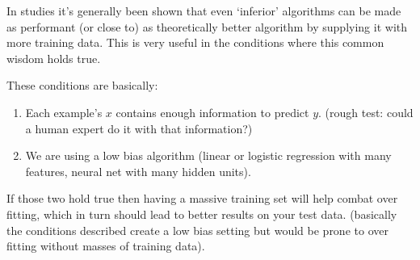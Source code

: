 In studies it's generally been shown that even `inferior' algorithms can be made as performant (or close to) as theoretically better algorithm by supplying it with more training data. This is very useful in the conditions where this common wisdom holds true.

These conditions are basically:

\begin{enumerate}
\item Each example's $x$ contains enough information to predict $y$. (rough test: could a human expert do it with that information?)
\item We are using a low bias algorithm (linear or logistic regression with many features, neural net with many hidden units).
\end{enumerate}

If those two hold true then having a massive training set will help combat over fitting, which in turn should lead to better results on your test data. (basically the conditions described create a low bias setting but would be prone to over fitting without masses of training data).